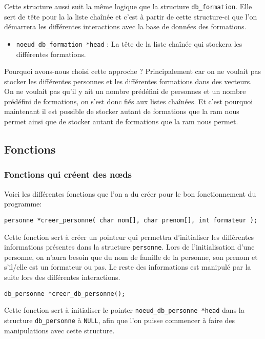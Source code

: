 \documentclass[10pt]{article}
\begin{document}
Cette structure aussi suit la même logique que la structure \texttt{db\_formation}. Elle sert de tête pour la la liste chaînée et c'est à partir de cette structure-ci que l'on démarrera les différentes interactions avec la base de données des formations.
\begin{itemize}
\item \texttt{noeud\_db\_formation *head} : La tête de la liste chaînée qui stockera les différentes formations.
\end{itemize}

Pourquoi avons-nous choisi cette approche ? Principalement car on ne voulait pas stocker les différentes personnes et les différentes formations dans des vecteurs. On ne voulait pas qu'il y ait un nombre prédéfini de personnes et un nombre prédéfini de formations, on s'est donc fiés aux listes chaînées. Et c'est pourquoi maintenant il est possible de stocker autant de formations que la \acrshort{ram} nous permet ainsi que de stocker autant de formations que la \acrshort{ram} nous permet.

\newpage
\subsection{Fonctions}
\subsubsection{Fonctions qui créent des n\oe{}ds}
Voici les différentes fonctions que l'on a du créer pour le bon fonctionnement du programme:
\begin{lstlisting}[firstnumber=144]
  personne *creer_personne( char nom[], char prenom[], int formateur );
\end{lstlisting}

Cette fonction sert à créer un pointeur qui permettra d'initialiser les différentes informations présentes dans la structure \texttt{personne}. Lors de l'initialisation d'une personne, on n'aura besoin que du nom de famille de la personne, son prenom et s'il/elle est un formateur ou pas. Le reste des informations est manipulé par la suite lors des différentes interactions.

\begin{lstlisting}[firstnumber=168]
  db_personne *creer_db_personne();
\end{lstlisting}

Cette fonction sert à initialiser le pointer \texttt{noeud\_db\_personne *head} dans la structure \texttt{db\_personne} à \texttt{NULL}, afin que l'on puisse commencer à faire des manipulations avec cette structure.
\end{document}
